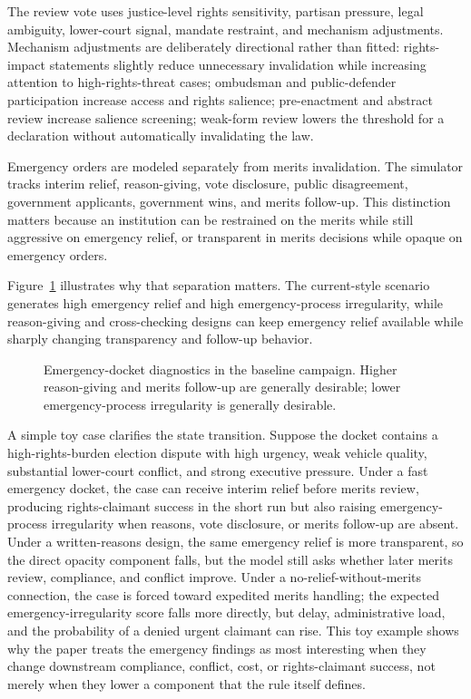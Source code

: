 \documentclass[
  journal=small,
  manuscript=research-article,
  year=2026
]{cup-journal}
\begin{document}
The review vote uses justice-level rights sensitivity, partisan pressure, legal ambiguity, lower-court signal, mandate restraint, and mechanism adjustments. Mechanism adjustments are deliberately directional rather than fitted: rights-impact statements slightly reduce unnecessary invalidation while increasing attention to high-rights-threat cases; ombudsman and public-defender participation increase access and rights salience; pre-enactment and abstract review increase salience screening; weak-form review lowers the threshold for a declaration without automatically invalidating the law.

Emergency orders are modeled separately from merits invalidation. The simulator tracks interim relief, reason-giving, vote disclosure, public disagreement, government applicants, government wins, and merits follow-up. This distinction matters because an institution can be restrained on the merits while still aggressive on emergency relief, or transparent in merits decisions while opaque on emergency orders.

Figure~\ref{fig:emergency-docket} illustrates why that separation matters. The current-style scenario generates high emergency relief and high emergency-process irregularity, while reason-giving and cross-checking designs can keep emergency relief available while sharply changing transparency and follow-up behavior.

\begin{figure}[hbt!]
\centering

\caption{Emergency-docket diagnostics in the baseline campaign. Higher reason-giving and merits follow-up are generally desirable; lower emergency-process irregularity is generally desirable.}
\label{fig:emergency-docket}
\end{figure}

A simple toy case clarifies the state transition. Suppose the docket contains a high-rights-burden election dispute with high urgency, weak vehicle quality, substantial lower-court conflict, and strong executive pressure. Under a fast emergency docket, the case can receive interim relief before merits review, producing rights-claimant success in the short run but also raising emergency-process irregularity when reasons, vote disclosure, or merits follow-up are absent. Under a written-reasons design, the same emergency relief is more transparent, so the direct opacity component falls, but the model still asks whether later merits review, compliance, and conflict improve. Under a no-relief-without-merits connection, the case is forced toward expedited merits handling; the expected emergency-irregularity score falls more directly, but delay, administrative load, and the probability of a denied urgent claimant can rise. This toy example shows why the paper treats the emergency findings as most interesting when they change downstream compliance, conflict, cost, or rights-claimant success, not merely when they lower a component that the rule itself defines.
\end{document}
